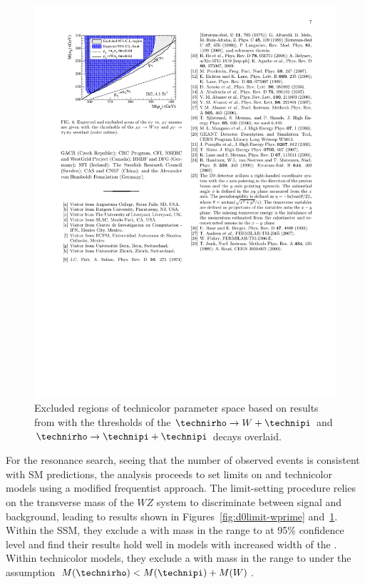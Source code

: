 \begin{figure}
  \centering
  \includegraphics{figures/d0limit-tc}
  \caption[Technicolor limits from \dzero]{Excluded regions of technicolor parameter space based on results from \dzero{} with the thresholds of the $\technirho \to W + \technipi$ and $\technirho \to \technipi + \technipi$ decays overlaid.}
  \label{fig:d0limit-tc}
\end{figure}

For the resonance search, seeing that the number of observed events is consistent with SM predictions, the analysis proceeds to set limits on \wprime and technicolor models using a modified frequentist approach.  The limit-setting procedure relies on the transverse mass of the $WZ$ system to discriminate between signal and background, leading to results shown in Figures~\ref{fig:d0limit-wprime} and~\ref{fig:d0limit-tc}.  Within the SSM, they exclude a \wprime with mass in the range  to  at 95\% confidence level and find their results hold well in models with increased width of the \wprime{}.  Within technicolor models, they exclude a \technirho with mass in the range  to  under the assumption $M(\technirho) < M(\technipi) + M(W)$.

